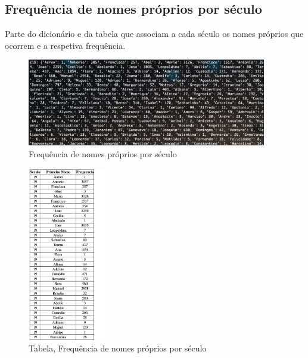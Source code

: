\documentclass[a4paper, 12pt]{article}
\begin{document}
\subsection{Frequência de nomes próprios por século}
Parte do dicionário e da tabela que associam a cada século os nomes próprios que ocorrem e a respetiva frequência.
\begin{figure}[H]
    \centering
    \includegraphics[height=1.5in]{2.png}
    \caption{Frequência de nomes próprios por século}
    \label{fig:my_label}
\end{figure}
\begin{figure}[H]
    \centering
    \includegraphics[height=3in]{2-tabela.png}
    \caption{Tabela, Frequência de nomes próprios por século}
    \label{fig:my_label}
\end{figure}
\newpage
\end{document}
